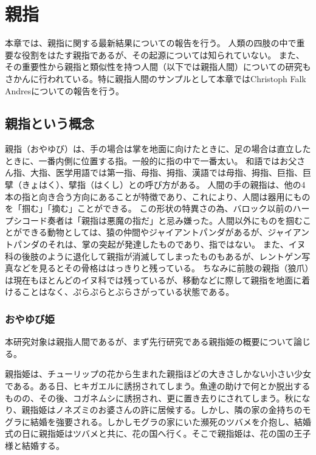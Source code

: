 \chapter{親指}
本章では、親指に関する最新結果についての報告を行う。
人類の四肢の中で重要な役割をはたす親指であるが、その起源については知られていない。
また、その重要性から親指と類似性を持つ人間（以下では親指人間）についての研究もさかんに行われている。特に親指人間のサンプルとして本章ではChristoph Falk Andresについての報告を行う。

\section{親指という概念}
親指（おやゆび）は、手の場合は掌を地面に向けたときに、足の場合は直立したときに、一番内側に位置する指。一般的に指の中で一番太い。
和語ではお父さん指、大指、医学用語では第一指、母指、拇指、漢語では母指、拇指、巨指、巨擘（きょはく）、擘指（はくし）との呼び方がある。
人間の手の親指は、他の4本の指と向き合う方向にあることが特徴であり、これにより、人間は器用にものを「掴む」「摘む」ことができる。
この形状の特異さの為、バロック以前のハープシコード奏者は「親指は悪魔の指だ」と忌み嫌った。人間以外にものを掴むことができる動物としては、猿の仲間やジャイアントパンダがあるが、ジャイアントパンダのそれは、掌の突起が発達したものであり、指ではない。
また、イヌ科の後肢のように退化して親指が消滅してしまったものもあるが、レントゲン写真などを見るとその骨格ははっきりと残っている。
ちなみに前肢の親指（狼爪）は現在もほとんどのイヌ科では残っているが、移動などに際して親指を地面に着けることはなく、ぷらぷらとぶらさがっている状態である。

\subsection{おやゆび姫}
本研究対象は親指人間であるが、まず先行研究である親指姫の概要について論じる。\par
親指姫は、チューリップの花から生まれた親指ほどの大きさしかない小さい少女である。ある日、ヒキガエルに誘拐されてしまう。魚達の助けで何とか脱出するものの、その後、コガネムシに誘拐され、更に置き去りにされてしまう。秋になり、親指姫はノネズミのお婆さんの許に居候する。しかし、隣の家の金持ちのモグラに結婚を強要される。しかしモグラの家にいた瀕死のツバメを介抱し、結婚式の日に親指姫はツバメと共に、花の国へ行く。そこで親指姫は、花の国の王子様と結婚する。\par

